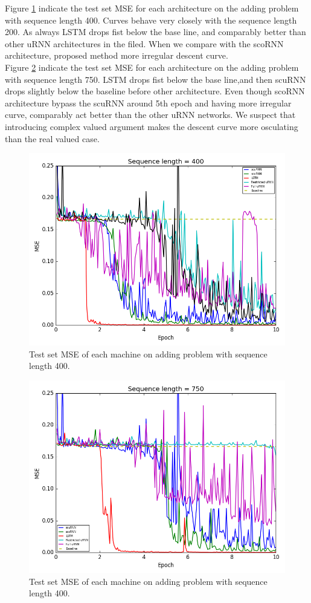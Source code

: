 \documentclass[letterpaper]{article} %
\begin{document}
\noindent Figure \ref{fig_adding_400} indicate the test set MSE for each architecture on the adding problem with sequence length 400. Curves behave very closely with the sequence length 200. As always LSTM drops fist below the base line, and comparably better than other uRNN architectures in the filed. When we compare with the scoRNN architecture, proposed method more irregular descent curve.\\

\noindent Figure \ref{fig_adding_750} indicate the test set MSE for each architecture on the adding problem with sequence length 750. LSTM drops fist below the base line,and then scuRNN drops slightly below the baseline before other architecture. Even though scoRNN architecture bypass the scuRNN around 5th epoch and having more irregular curve, comparably act better than the other uRNN networks. We suspect that introducing complex valued argument makes the descent curve more osculating than the real valued case. \\

\begin{figure}
\centering
\includegraphics[width=0.8\linewidth]{adding_400.png}
  \caption{Test set MSE of each machine on adding problem with sequence length 400.}
  \label{fig_adding_400}
\end{figure}

\begin{figure}
\centering
\includegraphics[width=0.8\linewidth]{adding_750.png}
  \caption{Test set MSE of each machine on adding problem with sequence length 400.}
  \label{fig_adding_750}
\end{figure}
\end{document}
